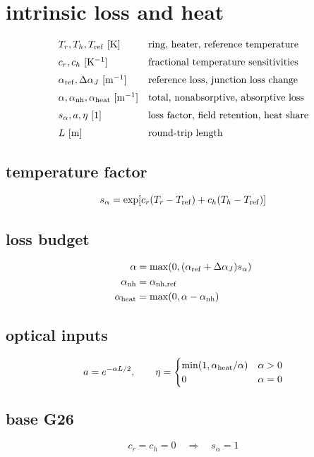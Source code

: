 \documentclass[11pt]{article}
\begin{document}
\section*{intrinsic loss and heat}
\[
\begin{array}{ll}T_r,T_h,T_{\rm ref}\ [\mathrm K]&\text{ring, heater, reference temperature}\\[0.6em]c_r,c_h\ [\mathrm{K^{-1}}]&\text{fractional temperature sensitivities}\\[0.6em]\alpha_{\rm ref},\Delta\alpha_J\ [\mathrm{m^{-1}}]&\text{reference loss, junction loss change}\\[0.6em]\alpha,\alpha_{\rm nh},\alpha_{\rm heat}\ [\mathrm{m^{-1}}]&\text{total, nonabsorptive, absorptive loss}\\[0.6em]s_\alpha,a,\eta\ [1]&\text{loss factor, field retention, heat share}\\[0.6em]L\ [\mathrm m]&\text{round-trip length}\end{array}
\]
\subsection*{temperature factor}
\[
\displaystyle s_\alpha=\exp\!\left[c_r(T_r-T_{\rm ref})+c_h(T_h-T_{\rm ref})\right]
\]
\subsection*{loss budget}
\[
\displaystyle \begin{aligned}\alpha&=\max\!\left(0,(\alpha_{\rm ref}+\Delta\alpha_J)s_\alpha\right)\\\alpha_{\rm nh}&=\alpha_{\rm nh,ref}\\\alpha_{\rm heat}&=\max(0,\alpha-\alpha_{\rm nh})\end{aligned}
\]
\subsection*{optical inputs}
\[
\displaystyle a=e^{-\alpha L/2},\qquad\eta=\begin{cases}\min(1,\alpha_{\rm heat}/\alpha)&\alpha>0\\0&\alpha=0\end{cases}
\]
\subsection*{base G26}
\[
\displaystyle c_r=c_h=0\quad\Longrightarrow\quad s_\alpha=1
\]

\clearpage
\end{document}
